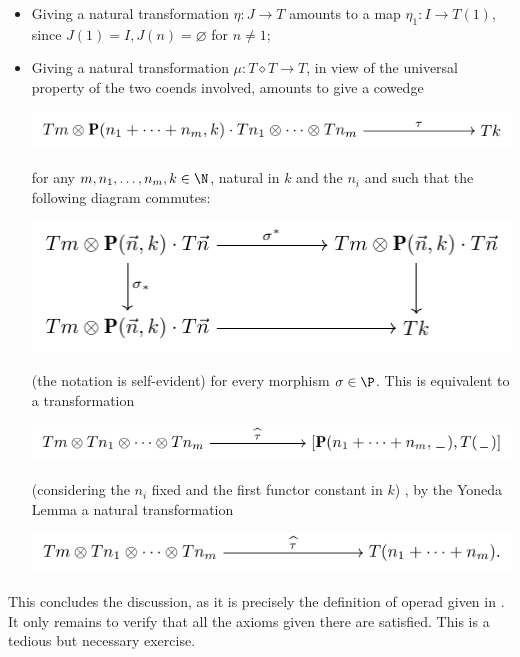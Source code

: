 \begin{itemize}
\item Giving a natural transformation $\eta\colon J\to T$ amounts to a map $\eta_1\colon I\to T(1)$, since $J(1)=I, J(n)=\varnothing$ for $n\neq 1$;
\item Giving a natural transformation $\mu\colon T\diamond T\to T$, in view of the universal property of the two coends involved, amounts to give a cowedge
\begin{center} 
 \includegraphics[scale=1]{figures/fig25} 
 \end{center}
for any $m,n_1,\dots, n_m,k\in\N$, natural in $k$ and the $n_i$ and such that the following diagram commutes:
\begin{center} 
 \includegraphics[scale=1]{figures/fig26} 
 \end{center}
(the notation is self-evident) for every morphism $\sigma\in \P$. This is equivalent to a transformation
\begin{center} 
 \includegraphics[scale=1]{figures/fig27} 
 \end{center}
(considering the $n_i$ fixed and the first functor constant in $k$) \ie, by the Yoneda Lemma a natural transformation
\begin{center} 
 \includegraphics[scale=1]{figures/fig28} 
 \end{center}
\end{itemize}
This concludes the discussion, as it is precisely the definition of operad given in \cite{MR1436914}. It only remains to verify that all the axioms given there are satisfied. This is a tedious but necessary exercise.
